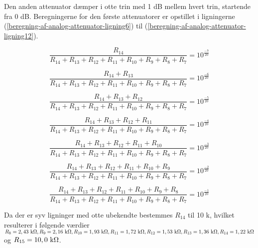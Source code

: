 Den anden attenuator dæmper i otte trin med 1 dB mellem hvert trin, startende fra 0 dB. Beregningerne for den første attenuatorer er opstillet i ligningerne (\ref{beregning-af-analog-attenuator-ligning6}) til (\ref{beregning-af-analog-attenuator-ligning12}).

\begin{equation}
\label{beregning-af-analog-attenuator-ligning6}
\frac{R_{14}}{R_{14} + R_{13} + R_{12} + R_{11} + R_{10} + R_{9} + R_{8} + R_{7}} = 10^{\frac{-7}{20}}
\end{equation}

\begin{equation}
\frac{R_{14} + R_{13}}{R_{14} + R_{13} + R_{12} + R_{11} + R_{10} + R_{9} + R_{8} + R_{7}} = 10^{\frac{-6}{20}}
\end{equation}

\begin{equation}
\frac{R_{14} + R_{13} + R_{12}}{R_{14} + R_{13} + R_{12} + R_{11} + R_{10} + R_{9} + R_{8} + R_{7}} = 10^{\frac{-5}{20}}
\end{equation}

\begin{equation}
\frac{R_{14} + R_{13} + R_{12} + R_{11}}{R_{14} + R_{13} + R_{12} + R_{11} + R_{10} + R_{9} + R_{8} + R_{7}} = 10^{\frac{-4}{20}}
\end{equation}

\begin{equation}
\frac{R_{14} + R_{13} + R_{12} + R_{11} + R_{10}}{R_{14} + R_{13} + R_{12} + R_{11} + R_{10} + R_{9} + R_{8} + R_{7}} = 10^{\frac{-3}{20}}
\end{equation}

\begin{equation}
\frac{R_{14} + R_{13} + R_{12} + R_{11} + R_{10} + R_{9}}{R_{14} + R_{13} + R_{12} + R_{11} + R_{10} + R_{9} + R_{8} + R_{7}} = 10^{\frac{-2}{20}}
\end{equation}

\begin{equation}
\label{beregning-af-analog-attenuator-ligning12}
\frac{R_{14} + R_{13} + R_{12} + R_{11} + R_{10} + R_{9} + R_{8}}{R_{14} + R_{13} + R_{12} + R_{11} + R_{10} + R_{9} + R_{8} + R_{7}} = 10^{\frac{-1}{20}}
\end{equation}

Da der er syv ligninger med otte ubekendte bestemmes $R_{14}$ til 10 k\ohm, hvilket resulterer i følgende værdier 
$R_{8} = 2,43 ~\mathrm{k}\ohm, R_{9} = 2,16 ~\mathrm{k}\ohm, R_{10} = 1,93 ~\mathrm{k}\ohm, R_{11} = 1,72 ~\mathrm{k}\ohm, R_{12} = 1,53 ~\mathrm{k}\ohm, R_{13} = 1,36 ~\mathrm{k}\ohm, R_{14} = 1,22 ~\mathrm{k}\ohm$ og $R_{15} = 10,0 ~\mathrm{k}\ohm$.